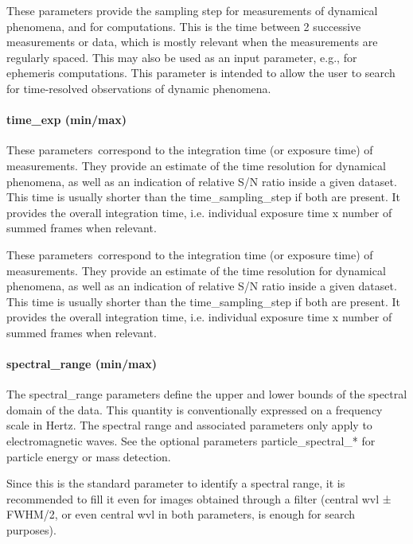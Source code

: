 \documentclass[11pt,a4paper]{ivoa}
\begin{document}
These parameters provide the sampling step for measurements of dynamical phenomena, and for computations. This is the time between 2 successive measurements or data, which is mostly relevant when the measurements are regularly spaced. This may also be used as an input parameter, e.g., for ephemeris computations. This parameter is intended to allow the user to search for time-resolved observations of dynamic phenomena.

\paragraph{time\_exp (min/max)}

These parameters correspond to the integration time (or exposure time) of measurements. They provide an estimate of the time resolution for dynamical phenomena, as well as an indication of relative S/N ratio inside a given dataset. This time is usually shorter than the time\_sampling\_step if both are present. It provides the overall integration time, i.e. individual exposure time x number of summed frames when relevant. 

These parameters correspond to the integration time (or exposure time) of measurements. They provide an estimate of the time resolution for dynamical phenomena, as well as an indication of relative S/N ratio inside a given dataset. This time is usually shorter than the time\_sampling\_step if both are present. It provides the overall integration time, i.e. individual exposure time x number of summed frames when relevant. 

\paragraph{spectral\_range (min/max)}

The spectral\_range parameters define the upper and lower bounds of the spectral domain of the data. This quantity is conventionally expressed on a frequency scale in Hertz. The spectral range and associated parameters only apply to electromagnetic waves. See the optional parameters particle\_spectral\_* for particle energy or mass detection.

Since this is the standard parameter to identify a spectral range, it is recommended to fill it even for images obtained through a filter (central wvl ± FWHM/2, or even central wvl in both parameters, is enough for search purposes). 
\end{document}

